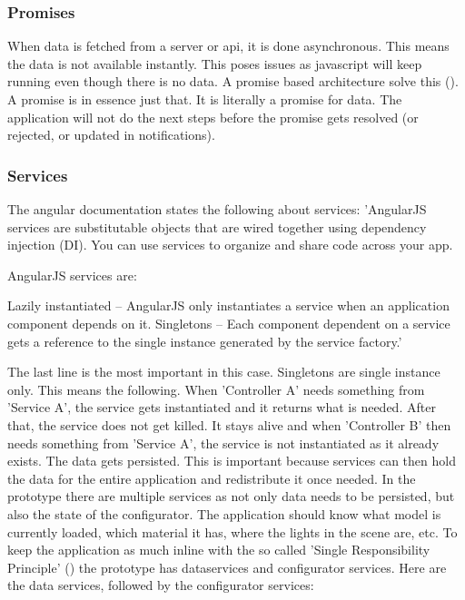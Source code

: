 \subsubsection{Promises}
When data is fetched from a server or api, it is done asynchronous. This means the data is not available instantly. This poses issues as javascript will keep running even though there is no data. A promise based architecture solve this (\cite{promiseBasedArchitecture}). A promise is in essence just that. It is literally a promise for data. The application will not do the next steps before the promise gets resolved (or rejected, or updated in notifications).

\subsubsection{Services}
The angular documentation states the following about services:\newline
'AngularJS services are substitutable objects that are wired together using dependency injection (DI). You can use services to organize and share code across your app.

AngularJS services are:

Lazily instantiated – AngularJS only instantiates a service when an application component depends on it.
Singletons – Each component dependent on a service gets a reference to the single instance generated by the service factory.'\newline

The last line is the most important in this case. Singletons are single instance only. This means the following. When 'Controller A' needs something from 'Service A', the service gets instantiated and it returns what is needed. After that, the service does not get killed. It stays alive and when 'Controller B' then needs something from 'Service A', the service is not instantiated as it already exists. The data gets persisted. This is important because services can then hold the data for the entire application and redistribute it once needed.\newline
In the prototype there are multiple services as not only data needs to be persisted, but also the state of the configurator. The application should know what model is currently loaded, which material it has, where the lights in the scene are, etc. To keep the application as much inline with the so called 'Single Responsibility Principle' (\cite{singleResponsibility}) the prototype has dataservices and configurator services. Here are the data services, followed by the configurator services: \linebreak


